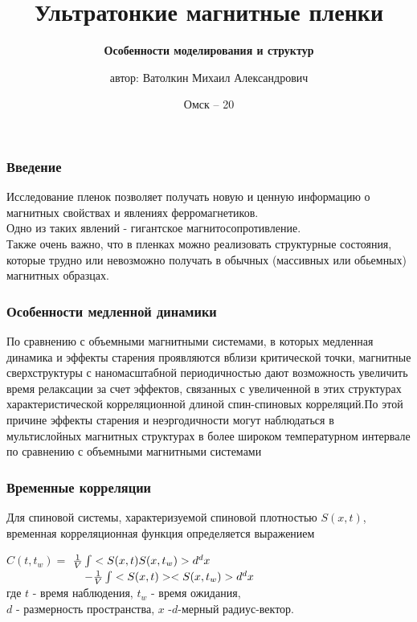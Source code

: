 \documentclass[pdf,unicode]{beamer}
\title[Ультратонкие магнитные пленки]{Ультратонкие магнитные пленки}
\subtitle{\textbf{Особенности моделирования и структур}}
\author[Ватолкин М.А.]{\rule{0pt}{1cm} автор: {Ватолкин Михаил Александрович}}
\institute{кафедра теоретической физики ОмГУ}
\date{Омск -- 20\Year}
\begin{document}
\begin{frame}
  \maketitle
\end{frame}

\begin{frame}
\frametitle{Введение}
Исследование пленок позволяет получать новую и ценную информацию о магнитных свойствах и явлениях ферромагнетиков.\\ 
Одно из таких явлений - гигантское магнитосопротивление.\\
Также очень важно, что в пленках можно реализовать структурные состояния, которые трудно или невозможно получать в обычных (массивных или обьемных) магнитных образцах.

\end{frame}

\begin{frame}
\frametitle{Особенности  медленной динамики}
	По сравнению с объемными магнитными системами, в которых медленная
	динамика и эффекты старения проявляются вблизи критической точки, магнитные сверхструктуры с
	наномасштабной периодичностью дают возможность
	увеличить время релаксации за счет эффектов, связанных с увеличенной в этих структурах характеристической корреляционной длиной спин-спиновых
	корреляций.По этой причине эффекты старения и
	неэргодичности могут наблюдаться в мультислойных
	магнитных структурах в более широком температурном интервале по сравнению с объемными магнитными системами
\end{frame}

\begin{frame}
    \frametitle{Временные корреляции}
    Для спиновой системы, характеризуемой спиновой плотностью $S(x,t)$, временная корреляционная функция определяется выражением



$ C(t,t_w)=$   ${1\over{V}}\int<S(x,t)S(x,t_w)>d^d x$  \\
 ~~~~~~~~~~~~~ $-{1\over{V}} \int<S(x,t)><S(x,t_w)>d^d x$\\

где $t$ - время наблюдения, $t_w$ - время ожидания, \\$d$ - размерность пространства, $x$ -$d$-мерный радиус-вектор.
\end{frame}
\end{document}
